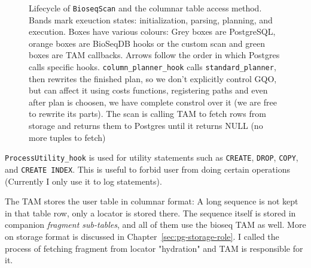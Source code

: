 \begin{figure}[htbp]
\caption{Lifecycle of \texttt{BioseqScan} and the columnar table access method.
Bands mark exeuction states: initialization, parsing, planning, and execution.
Boxes have various colours: Grey boxes are PostgreSQL, orange boxes are BioSeqDB hooks or the custom scan and green boxes are TAM callbacks.
Arrows follow the order in which Postgres calls specific hooks.
\texttt{column\_planner\_hook} calls \texttt{standard\_planner}, then rewrites the finished plan, so we don't explicitly control GQO, but can affect it using costs functions, registering paths and even after plan is choosen, we have complete constrol over it (we are free to rewrite its parts).
The scan is calling TAM to fetch rows from storage and returns them to Postgres until it returns NULL (no more tuples to fetch)}
\label{fig:bioseqscan-hook-lifecycle}
\end{figure}

\texttt{ProcessUtility\_hook} is used for utility statements such as \texttt{CREATE}, \texttt{DROP}, \texttt{COPY}, and \texttt{CREATE INDEX}. This is useful to forbid user from doing certain operations (Currently I only use it to log statements).

The TAM stores the user table in columnar format: A long sequence is not kept in that table row, only a locator is stored there.
The sequence itself is stored in companion \emph{fragment sub-tables}, and all of them use the bioseq TAM as well. 
More on storage format is discussed in Chapter~\ref{sec:pg-storage-role}.
I called the process of fetching fragment from locator "hydration" and TAM is responsible for it.

